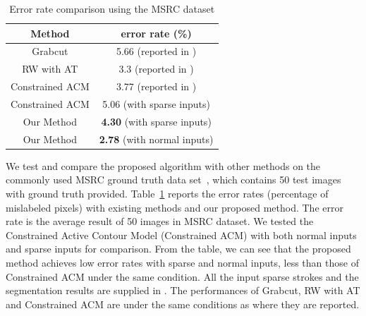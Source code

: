 \documentclass{article}
\begin{document}
\begin{table}[!htb]
    \begin{center}
        \begin{tabular}{|c|c|}
        \hline
        Method & error rate (\%)\\
        \hline \hline
        Grabcut\cite{rother2004grabcut} & 5.66 (reported in \cite{nguyen2012robust}) \\
        RW with AT\cite{duchenne2008segmentation} & 3.3 (reported in \cite{duchenne2008segmentation})\\
        Constrained ACM\cite{nguyen2012robust} & 3.77 (reported in \cite{nguyen2012robust}) \\
        Constrained ACM\cite{nguyen2012robust} & 5.06 (with sparse inputs) \\
        Our Method & \textbf{4.30} (with sparse inputs)\\
        Our Method & \textbf{2.78} (with normal inputs)\\
        \hline
        \end{tabular}
    \end{center}
    \vspace{-2em}
    \caption{\small{Error rate comparison using the MSRC dataset}}
    \label{table:tableerrorrate_mstc}
\end{table}
We test and compare the proposed algorithm with other methods on the commonly used MSRC ground truth data set~\cite{rother2004grabcut}, which contains 50 test images with ground truth provided. Table~\ref{table:tableerrorrate_mstc} reports the error rates (percentage of mislabeled pixels) with existing methods and our proposed method. The error rate is the average result of 50 images in MSRC dataset. We tested the Constrained Active Contour Model (Constrained ACM) with both normal inputs and sparse inputs for comparison. From the table, we can see that the proposed method achieves low error rates with sparse and normal inputs, less than those of Constrained ACM \cite{nguyen2012robust} under the same condition. All the input sparse strokes and the segmentation results are supplied in \cite{sub}. The performances of Grabcut\cite{rother2004grabcut}, RW with AT\cite{duchenne2008segmentation} and Constrained ACM\cite{nguyen2012robust} are under the same conditions as where they are reported.
\end{document}
